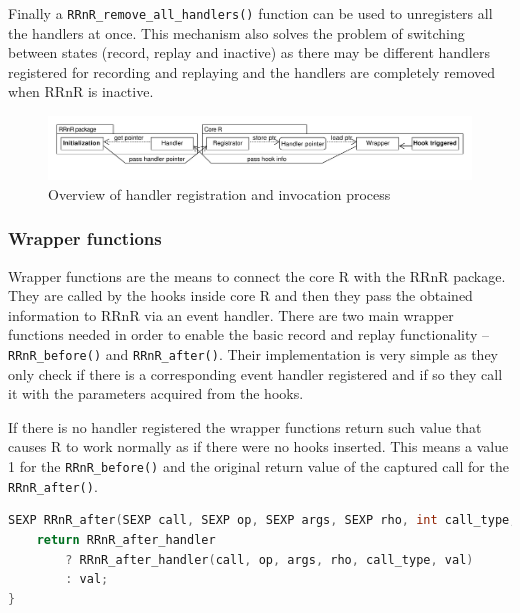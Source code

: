 \documentclass[thesis=M,english,hidelinks]{FITthesis}[2012/10/20]
\begin{document}
			Finally a \lstinline|RRnR_remove_|\allowbreak\lstinline|all_handlers()| function can be used to unregisters all the handlers at once. This mechanism also solves the problem of switching between states (record, replay and inactive) as there may be different handlers registered for recording and replaying and the handlers are completely removed when RRnR is inactive.\par
			
			\begin{figure}[ht]\centering
				\includegraphics[width=1.0\textwidth]{img/registrators}
				\caption{Overview of handler registration and invocation process}\label{fig:registrators}
			\end{figure}
			
			\vspace{-12pt}
			\subsubsection{Wrapper functions}
			Wrapper functions are the means to connect the core R with the RRnR package. They are called by the hooks inside core R and then they pass the obtained information to RRnR via an event handler. There are two main wrapper functions needed in order to enable the basic record and replay functionality -- \lstinline|RRnR_before()| and \lstinline|RRnR_after()|. Their implementation is very simple as they only check if there is a corresponding event handler registered and if so they call it with the parameters acquired from the hooks.\par
			
			If there is no handler registered the wrapper functions return such value that causes R to work normally as if there were no hooks inserted. This means a value 1 for the \lstinline|RRnR_before()| and the original return value of the captured call for the \lstinline|RRnR_after()|.\par
			
\begin{lstlisting}[style=filestyle, language=C, caption={The \lstinline|RRnR_after()| wrapper function}]
SEXP RRnR_after(SEXP call, SEXP op, SEXP args, SEXP rho, int call_type, SEXP val) {
	return RRnR_after_handler
		? RRnR_after_handler(call, op, args, rho, call_type, val)
		: val;
}
\end{lstlisting}
			
\end{document}
